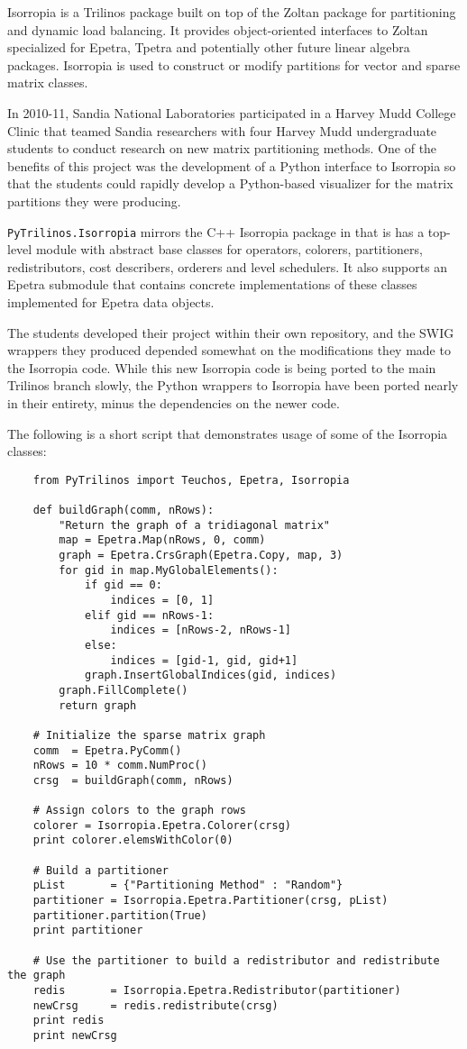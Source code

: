 \documentclass[11pt]{article}
\begin{document}
Isorropia is a Trilinos package built on top of the Zoltan package for partitioning and dynamic load balancing.  It provides object-oriented interfaces to Zoltan specialized for Epetra, Tpetra and potentially other future linear algebra packages.  Isorropia is used to construct or modify partitions for vector and sparse matrix classes.

In 2010-11, Sandia National Laboratories participated in a Harvey Mudd College Clinic that teamed Sandia researchers with four Harvey Mudd undergraduate students to conduct research on new matrix partitioning methods.  One of the benefits of this project was the development of a Python interface to Isorropia so that the students could rapidly develop a Python-based visualizer for the matrix partitions they were producing.

{\tt PyTrilinos.Isorropia} mirrors the C++ Isorropia package in that is has a top-level module with abstract base classes for operators, colorers, partitioners, redistributors, cost describers, orderers and level schedulers.  It also supports an Epetra submodule that contains concrete implementations of these classes implemented for Epetra data objects.

The students developed their project within their own repository, and the SWIG wrappers they produced depended somewhat on the modifications they made to the Isorropia code.  While this new Isorropia code is being ported to the main Trilinos branch slowly, the Python wrappers to Isorropia have been ported nearly in their entirety, minus the dependencies on the newer code.

The following is a short script that demonstrates usage of some of the Isorropia classes:
\begin{verbatim}
    from PyTrilinos import Teuchos, Epetra, Isorropia
    
    def buildGraph(comm, nRows):
        "Return the graph of a tridiagonal matrix"
        map = Epetra.Map(nRows, 0, comm)
        graph = Epetra.CrsGraph(Epetra.Copy, map, 3)
        for gid in map.MyGlobalElements():
            if gid == 0:
                indices = [0, 1]
            elif gid == nRows-1:
                indices = [nRows-2, nRows-1]
            else:
                indices = [gid-1, gid, gid+1]
            graph.InsertGlobalIndices(gid, indices)
        graph.FillComplete()
        return graph

    # Initialize the sparse matrix graph
    comm  = Epetra.PyComm()
    nRows = 10 * comm.NumProc()
    crsg  = buildGraph(comm, nRows)

    # Assign colors to the graph rows
    colorer = Isorropia.Epetra.Colorer(crsg)
    print colorer.elemsWithColor(0)

    # Build a partitioner
    pList       = {"Partitioning Method" : "Random"}
    partitioner = Isorropia.Epetra.Partitioner(crsg, pList)
    partitioner.partition(True)
    print partitioner

    # Use the partitioner to build a redistributor and redistribute the graph
    redis       = Isorropia.Epetra.Redistributor(partitioner)
    newCrsg     = redis.redistribute(crsg)
    print redis
    print newCrsg
\end{verbatim}
\end{document}

